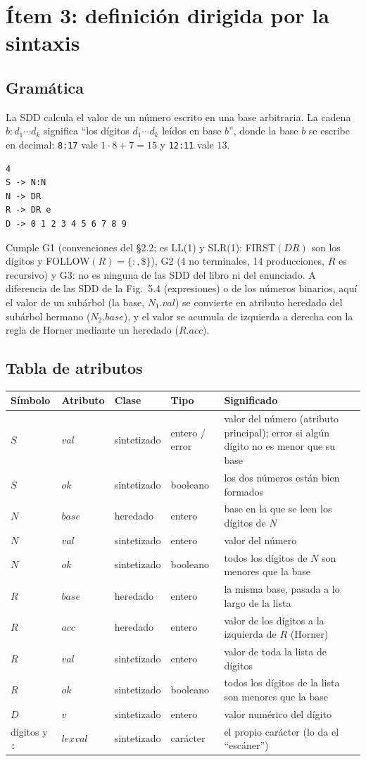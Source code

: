 \documentclass[11pt,a4paper]{article}
\newcommand{\code}[1]{\texttt{#1}}
\begin{document}
\section{Ítem 3: definición dirigida por la sintaxis}

\subsection{Gramática}
La SDD calcula el valor de un número escrito en una base arbitraria. La cadena $b{:}d_1\cdots
d_k$ significa ``los dígitos $d_1\cdots d_k$ leídos en base $b$'', donde la base $b$ se escribe
en decimal: \code{8:17} vale $1\cdot 8+7=15$ y \code{12:11} vale $13$.
\begin{Verbatim}
4
S -> N:N
N -> DR
R -> DR e
D -> 0 1 2 3 4 5 6 7 8 9
\end{Verbatim}
Cumple G1 (convenciones del §2.2; es LL(1) y SLR(1): FIRST$(DR)$ son los dígitos y
FOLLOW$(R)=\{:,\$\}$), G2 (4 no terminales, 14 producciones, $R$ es recursivo) y G3: no es
ninguna de las SDD del libro ni del enunciado. A diferencia de las SDD de la Fig.~5.4 (expresiones)
o de los números binarios, aquí el valor de un subárbol (la base, $N_1.val$) se convierte en
atributo heredado del subárbol hermano ($N_2.base$), y el valor se acumula de izquierda a derecha
con la regla de Horner mediante un heredado ($R.acc$).

\subsection{Tabla de atributos}
\begin{tabular}{llllp{6.4cm}}
\toprule
\textbf{Símbolo} & \textbf{Atributo} & \textbf{Clase} & \textbf{Tipo} & \textbf{Significado}\\
\midrule
$S$ & $val$ & sintetizado & entero / error & valor del número (atributo principal); error si algún
dígito no es menor que su base\\
$S$ & $ok$ & sintetizado & booleano & los dos números están bien formados\\
$N$ & $base$ & heredado & entero & base en la que se leen los dígitos de $N$\\
$N$ & $val$ & sintetizado & entero & valor del número\\
$N$ & $ok$ & sintetizado & booleano & todos los dígitos de $N$ son menores que la base\\
$R$ & $base$ & heredado & entero & la misma base, pasada a lo largo de la lista\\
$R$ & $acc$ & heredado & entero & valor de los dígitos a la izquierda de $R$ (Horner)\\
$R$ & $val$ & sintetizado & entero & valor de toda la lista de dígitos\\
$R$ & $ok$ & sintetizado & booleano & todos los dígitos de la lista son menores que la base\\
$D$ & $v$ & sintetizado & entero & valor numérico del dígito\\
dígitos y \code{:} & $lexval$ & sintetizado & carácter & el propio carácter (lo da el
``escáner'')\\
\bottomrule
\end{tabular}
\end{document}
